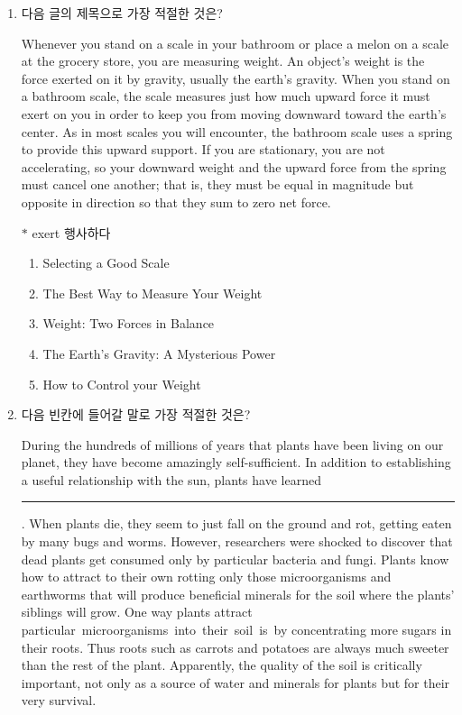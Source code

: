 \documentclass[9pt, a4paper, twocolumn]{oblivoir}
\begin{document}
    \begin{enumerate}
        \item 다음 글의 제목으로 가장 적절한 것은? 

        Whenever you stand on a scale in your bathroom or place a
melon on a scale at the grocery store, you are measuring
weight. An object’s weight is the force exerted on it by
gravity, usually the earth’s gravity. When you stand on a
bathroom scale, the scale measures just how much upward
force it must exert on you in order to keep you from moving
downward toward the earth’s center. As in most scales you will
encounter, the bathroom scale uses a spring to provide this
upward support. If you are stationary, you are not accelerating,
so your downward weight and the upward force from the
spring must cancel one another; that is, they must be equal in
magnitude but opposite in direction so that they sum to zero
net force.
\begin{flushright}
    {\small $*$ exert 행사하다}
\end{flushright}
        \begin{enumerate}
            \item Selecting a Good Scale
            \item The Best Way to Measure Your Weight
            \item Weight: Two Forces in Balance %
            \item The Earth's Gravity: A Mysterious Power
            \item How to Control your Weight
        \end{enumerate}

        \pagebreak

        \item 다음 빈칸에 들어갈 말로 가장 적절한 것은?
        
        During the hundreds of millions of years that plants
have been living on our planet, they have become
amazingly self-sufficient. In addition to establishing a
useful relationship with the sun, plants have learned \rule{5cm}{0.1mm}
. When plants die, they seem
to just fall on the ground and rot, getting eaten by many
bugs and worms. However, researchers were shocked to
discover that dead plants get consumed only by particular
bacteria and fungi. Plants know how to attract to their
own rotting only those microorganisms and earthworms
that will produce beneficial minerals for the soil where
the plants’ siblings will grow. One way plants attract
particular~microorganisms~into~their~soil~is~by
concentrating more sugars in their roots. Thus roots such
as carrots and potatoes are always much sweeter than the
rest of the plant. Apparently, the quality of the soil is
critically important, not only as a source of water and
minerals for plants but for their very survival.


\end{enumerate}
\end{document}
